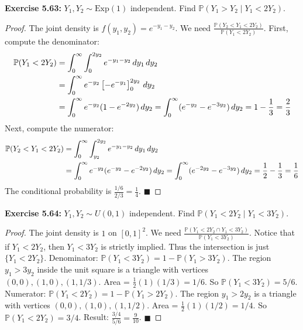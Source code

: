 \documentclass[11pt, a4paper]{article}
\theoremstyle{definition}
\theoremstyle{remark}
\newcommand{\Prob}{\mathbb{P}}
\begin{document}
\textbf{Exercise 5.63:} $Y_1, Y_2 \sim \text{Exp}(1)$ independent. Find $\Prob(Y_1 > Y_2 \mid Y_1 < 2Y_2)$.
\begin{proof}
The joint density is $f(y_1, y_2) = e^{-y_1-y_2}$. We need $\frac{\Prob(Y_2 < Y_1 < 2Y_2)}{\Prob(Y_1 < 2Y_2)}$.
First, compute the denominator:
\begin{align*}
\Prob(Y_1 < 2Y_2) &= \int_{0}^{\infty} \int_{0}^{2y_2} e^{-y_1-y_2} \, dy_1 \, dy_2 \\ \relax
&= \int_{0}^{\infty} e^{-y_2} \left[ -e^{-y_1} \right]_0^{2y_2} \, dy_2 \\ \relax
&= \int_{0}^{\infty} e^{-y_2} (1 - e^{-2y_2}) \, dy_2 = \int_{0}^{\infty} (e^{-y_2} - e^{-3y_2}) \, dy_2 = 1 - \frac{1}{3} = \frac{2}{3}
\end{align*}
Next, compute the numerator:
\begin{align*}
\Prob(Y_2 < Y_1 < 2Y_2) &= \int_{0}^{\infty} \int_{y_2}^{2y_2} e^{-y_1-y_2} \, dy_1 \, dy_2 \\ \relax
&= \int_{0}^{\infty} e^{-y_2} (e^{-y_2} - e^{-2y_2}) \, dy_2 = \int_{0}^{\infty} (e^{-2y_2} - e^{-3y_2}) \, dy_2 = \frac{1}{2} - \frac{1}{3} = \frac{1}{6}
\end{align*}
The conditional probability is $\frac{1/6}{2/3} = \frac{1}{4}$. $\blacksquare$
\end{proof}

\textbf{Exercise 5.64:} $Y_1, Y_2 \sim U(0,1)$ independent. Find $\Prob(Y_1 < 2Y_2 \mid Y_1 < 3Y_2)$.
\begin{proof}
The joint density is $1$ on $[0,1]^2$. We need $\frac{\Prob(Y_1 < 2Y_2 \cap Y_1 < 3Y_2)}{\Prob(Y_1 < 3Y_2)}$.
Notice that if $Y_1 < 2Y_2$, then $Y_1 < 3Y_2$ is strictly implied. Thus the intersection is just $\{Y_1 < 2Y_2\}$.
Denominator: $\Prob(Y_1 < 3Y_2) = 1 - \Prob(Y_1 > 3Y_2)$. The region $y_1 > 3y_2$ inside the unit square is a triangle with vertices $(0,0), (1,0), (1, 1/3)$. Area = $\frac{1}{2}(1)(1/3) = 1/6$. So $\Prob(Y_1 < 3Y_2) = 5/6$.
Numerator: $\Prob(Y_1 < 2Y_2) = 1 - \Prob(Y_1 > 2Y_2)$. The region $y_1 > 2y_2$ is a triangle with vertices $(0,0), (1,0), (1, 1/2)$. Area = $\frac{1}{2}(1)(1/2) = 1/4$. So $\Prob(Y_1 < 2Y_2) = 3/4$.
Result: $\frac{3/4}{5/6} = \frac{9}{10}$. $\blacksquare$
\end{proof}
\end{document}

